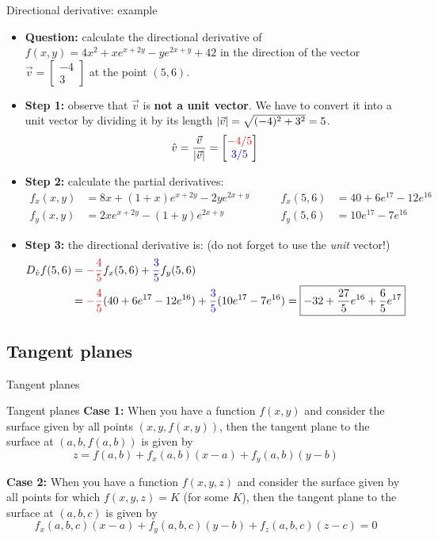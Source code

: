 \begin{frame}{Directional derivative: example}
\footnotesize
    \begin{itemize}
        \item \textbf{Question:} calculate the directional derivative of $f(x,y)=4x^2+xe^{x+2y}-ye^{2x+y}+42$ in the direction of the vector $\vec{v}=\begin{bmatrix}-4\\3\end{bmatrix}$ at the point $(5,6)$.
        \item\pause \textbf{Step 1:} observe that $\vec{v}$ is \textbf{not a unit vector}. We have to convert it into a unit vector by dividing it by its length $|\vec{v}|=\sqrt{(-4)^2+3^2}=5$.
        \[\hat{v}=\frac{\vec{v}}{|\vec{v}|}=\begin{bmatrix}\textcolor{red}{-4/5}\\\textcolor{blue}{3/5}\end{bmatrix}\]
        \item\pause \textbf{Step 2:} calculate the partial derivatives:
        \begin{align*}
            f_x(x,y)&=8x+(1+x)e^{x+2y}-2ye^{2x+y}\qquad&f_x(5,6)&=40+6e^{17}-12e^{16}\\
            f_y(x,y)&=2xe^{x+2y}-(1+y)e^{2x+y} &f_y(5,6)&=10e^{17}-7e^{16}
        \end{align*}
        \item\pause \textbf{Step 3:} the directional derivative is: (do not forget to use the \textit{unit} vector!)
        \begin{align*}D_{\hat{v}}f(5,6)&=\textcolor{red}{-\frac{4}{5}}f_x(5,6)+\textcolor{blue}{\frac{3}{5}}f_y(5,6)\\
        &=\textcolor{red}{-\frac{4}{5}}(40+6e^{17}-12e^{16})+\textcolor{blue}{\frac{3}{5}}(10e^{17}-7e^{16})=\boxed{-32+\frac{27}{5}e^{16}+\frac{6}{5}e^{17}}
        \end{align*}
    \end{itemize}
\end{frame}


\subsection{Tangent planes}

\begin{frame}{Tangent planes}
    \begin{theorybox}{Tangent planes}
        \textbf{Case 1:} When you have a function $f(x,y)$ and consider the surface given by all points $(x,y,f(x,y))$, then the tangent plane to the surface at $(a,b,f(a,b))$ is given by \[\boxed{z=f(a,b)+f_x(a,b)(x-a)+f_y(a,b)(y-b)}\]

        \pause\textbf{Case 2:} When you have a function $f(x,y,z)$ and consider the surface given by all points for which $f(x,y,z)=K$ (for some $K$), then the tangent plane to the surface at $(a,b,c)$ is given by
        \[\boxed{f_x(a,b,c)(x-a)+f_y(a,b,c)(y-b)+f_z(a,b,c)(z-c)=0}\]
    \end{theorybox}
\end{frame}

